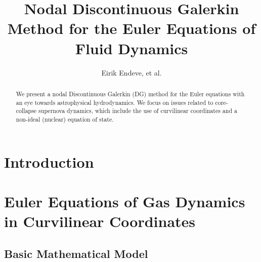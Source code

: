 \documentclass[10pt,preprint]{aastex}
\begin{document}
\title{Nodal Discontinuous Galerkin Method for the Euler Equations of Fluid Dynamics}
\author{Eirik Endeve, et al.}

\begin{abstract}
We present a nodal Discontinuous Galerkin (DG) method for the Euler equations with an eye towards astrophysical hydrodynamics.  
We focus on issues related to core-collapse supernova dynamics, which include the use of curvilinear coordinates and a non-ideal (nuclear) equation of state.  
\end{abstract}

\tableofcontents

\section{Introduction}

\clearpage

\section{Euler Equations of Gas Dynamics in Curvilinear Coordinates}

\subsection{Basic Mathematical Model}
\end{document}
